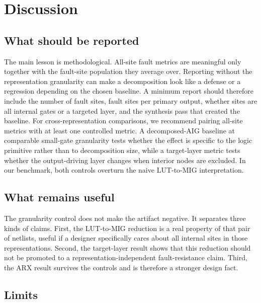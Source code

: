 \section{Discussion}
\label{sec:discussion}

\subsection{What should be reported}
\label{sec:discussion:reporting}

The main lesson is methodological. All-site fault metrics are meaningful
only together with the fault-site population they average over. Reporting
\AvgDP{} without the representation granularity can make a decomposition
look like a defense or a regression depending on the chosen baseline. A
minimum report should therefore include the number of fault sites,
fault sites per primary output, whether sites are all internal gates or a
targeted layer, and the synthesis pass that created the baseline. For
cross-representation comparisons, we recommend pairing all-site metrics
with at least one controlled metric. A decomposed-AIG baseline at
comparable small-gate granularity tests whether the effect is specific
to the logic primitive rather than to decomposition size, while a
target-layer metric tests whether the output-driving layer changes when
interior nodes are excluded. In our benchmark, both controls overturn
the naive LUT-to-MIG interpretation.

\subsection{What remains useful}
\label{sec:discussion:robust}

The granularity control does not make the artifact negative. It separates
three kinds of claims. First, the LUT-to-MIG \AvgDP{} reduction is a
real property of that pair of netlists, useful if a designer specifically
cares about all internal sites in those representations. Second, the
target-layer result shows that this reduction should not be promoted to a
representation-independent fault-resistance claim. Third, the ARX
\AvgBW{} result survives the controls and is therefore a stronger
design fact.

\subsection{Limits}
\label{sec:discussion:limits}

